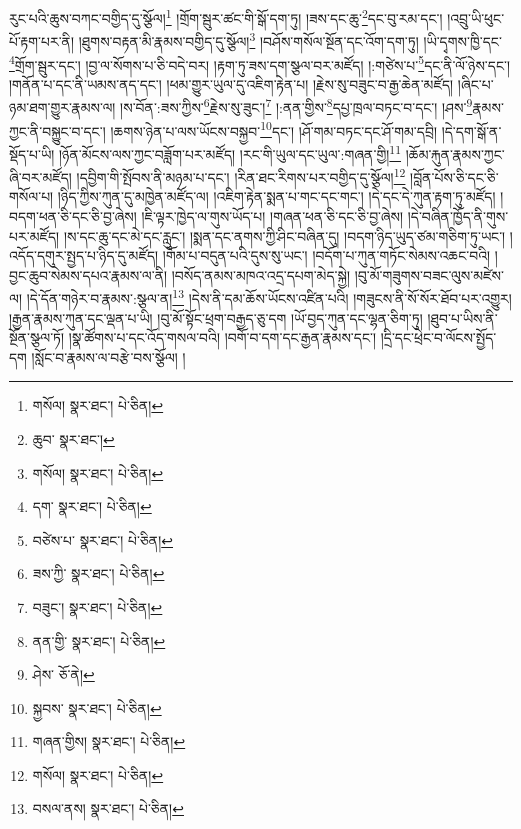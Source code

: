 རུང་པའི་ཆུས་བཀང་བགྱིད་དུ་སྩོལ།\footnote{གསོལ།  སྣར་ཐང་།  པེ་ཅིན། } །གྲོག་སྦུར་ཚང་གི་སྒོ་དག་ཏུ། །ཟས་དང་ཆུ་\footnote{ཆུབ་  སྣར་ཐང་། }དང་བུ་རམ་དང་། །འབྲུ་ཡི་ཕུང་པོ་རྟག་པར་ནི། །ཐུགས་བརྟན་མི་རྣམས་བགྱིད་དུ་སྩོལ།\footnote{གསོལ།  སྣར་ཐང་།  པེ་ཅིན། } །བཤོས་གསོལ་སྔོན་དང་འོག་དག་ཏུ། །ཡི་དྭགས་ཁྱི་དང་\footnote{དག་  སྣར་ཐང་།  པེ་ཅིན། }གྲོག་སྦུར་དང་། །བྱ་ལ་སོགས་པ་ཅི་བདེ་བར། །རྟག་ཏུ་ཟས་དག་སྩལ་བར་མཛོད། །:གཙེས་པ་\footnote{བཙེས་པ་  སྣར་ཐང་།  པེ་ཅིན། }དང་ནི་ལོ་ཉེས་དང་། །གནོན་པ་དང་ནི་ཡམས་ནད་དང་། །ཕམ་གྱུར་ཡུལ་དུ་འཇིག་རྟེན་པ། །རྗེས་སུ་བཟུང་བ་རྒྱ་ཆེན་མཛོད། །ཞིང་པ་ཉམ་ཐག་གྱུར་རྣམས་ལ། །ས་བོན་:ཟས་ཀྱིས་\footnote{ཟས་ཀྱི་  སྣར་ཐང་།  པེ་ཅིན། }རྗེས་སུ་ཟུང་།\footnote{བཟུང་།  སྣར་ཐང་།  པེ་ཅིན། } །:ནན་གྱིས་\footnote{ནན་གྱི་  སྣར་ཐང་།  པེ་ཅིན། }དཔྱ་ཁྲལ་བཏང་བ་དང་། །ཤས་\footnote{ཤེས་  ཅོ་ནེ། }རྣམས་ཀྱང་ནི་བསྐྱུང་བ་དང་། །ཆགས་ཉེན་པ་ལས་ཡོངས་བསྐྱབ་\footnote{སྐྱབས་  སྣར་ཐང་།  པེ་ཅིན། }དང་། །ཤོ་གམ་བཏང་དང་ཤོ་གམ་དབྲི། །དེ་དག་སྒོ་ན་སྡོད་པ་ཡི། །ཉོན་མོངས་ལས་ཀྱང་བཟློག་པར་མཛོད། །རང་གི་ཡུལ་དང་ཡུལ་:གཞན་གྱི།\footnote{གཞན་གྱིས།  སྣར་ཐང་།  པེ་ཅིན། } །ཆོམ་རྐུན་རྣམས་ཀྱང་ཞི་བར་མཛོད། །དབྱིག་གི་སྤོབས་ནི་མཉམ་པ་དང་། །རིན་ཐང་རིགས་པར་བགྱིད་དུ་སྩོལ།\footnote{གསོལ།  སྣར་ཐང་།  པེ་ཅིན། } །བློན་པོས་ཅི་དང་ཅི་གསོལ་པ། །ཉིད་ཀྱིས་ཀུན་དུ་མཁྱེན་མཛོད་ལ། །འཇིག་རྟེན་སྨན་པ་གང་དང་གང་། །དེ་དང་དེ་ཀུན་རྟག་ཏུ་མཛོད། །བདག་ཕན་ཅི་དང་ཅི་བྱ་ཞེས། །ཇི་ལྟར་ཁྱེད་ལ་གུས་ཡོད་པ། །གཞན་ཕན་ཅི་དང་ཅི་བྱ་ཞེས། །དེ་བཞིན་ཁྱོད་ནི་གུས་པར་མཛོད། །ས་དང་ཆུ་དང་མེ་དང་རླུང་། །སྨན་དང་ནགས་ཀྱི་ཤིང་བཞིན་དུ། །བདག་ཉིད་ཡུད་ཙམ་གཅིག་ཏུ་ཡང་། །འདོད་དགུར་སྤྱད་པ་ཉིད་དུ་མཛོད། །གོམ་པ་བདུན་པའི་དུས་སུ་ཡང་། །བདོག་པ་ཀུན་གཏོང་སེམས་འཆང་བའི། །བྱང་ཆུབ་སེམས་དཔའ་རྣམས་ལ་ནི། །བསོད་ནམས་མཁའ་འདྲ་དཔག་མེད་སྐྱེ། །བུ་མོ་གཟུགས་བཟང་ལུས་མཛེས་ལ། །དེ་དོན་གཉེར་བ་རྣམས་:སྩལ་ན།\footnote{བསལ་ནས།  སྣར་ཐང་།  པེ་ཅིན། } །དེས་ནི་དམ་ཆོས་ཡོངས་འཛིན་པའི། །གཟུངས་ནི་སོ་སོར་ཐོབ་པར་འགྱུར། །རྒྱན་རྣམས་ཀུན་དང་ལྡན་པ་ཡི། །བུ་མོ་སྟོང་ཕྲག་བརྒྱད་ཅུ་དག །ཡོ་བྱད་ཀུན་དང་ལྷན་ཅིག་ཏུ། །ཐུབ་པ་ཡིས་ནི་སྔོན་སྩལ་ཏོ། །སྣ་ཚོགས་པ་དང་འོད་གསལ་བའི། །བགོ་བ་དག་དང་རྒྱན་རྣམས་དང་། །དྲི་དང་ཕྲེང་བ་ལོངས་སྤྱོད་དག །སློང་བ་རྣམས་ལ་བརྩེ་བས་སྩོལ། །
